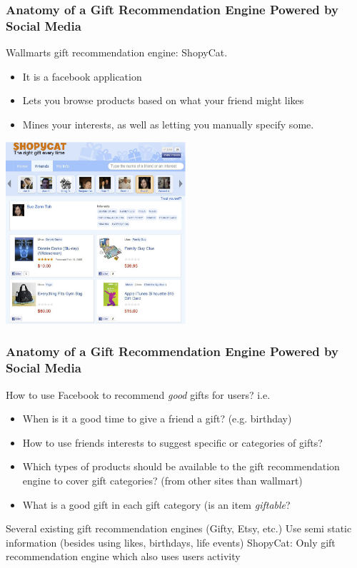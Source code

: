 \begin{frame}[plain] %
\frametitle{Anatomy of a Gift Recommendation Engine Powered by Social Media}

Wallmarts gift recommendation engine: ShopyCat.

\begin{itemize}
\item It is a facebook application
\item Lets you browse products based on what your friend might likes
\item Mines your interests, as well as letting you manually specify some.
\end{itemize}

    \includegraphics[width=0.5\textwidth]{images/SMC-5-1.png} 
\end{frame}

\begin{frame}[plain]
\frametitle{Anatomy of a Gift Recommendation Engine Powered by Social Media}

How to use Facebook to recommend \textit{good} gifts for users? i.e.
\begin{itemize}
\item When is it a good time to give a friend a gift? (e.g. birthday)
\item How to use friends interests to suggest specific or categories of gifts?
\item Which types of products should be available to the gift recommendation engine to cover gift categories? (from other sites than wallmart) 
\item What is a good gift in each gift category (is an item \textit{giftable}?
\end{itemize}

\vspace{0.5em}
\begin{itemize}
\ritem Several existing gift recommendation engines (Gifty, Etsy, etc.) Use semi static information (besides using likes, birthdays, life events)
\ritem ShopyCat: Only gift recommendation engine which also uses users activity 
\end{itemize}

\end{frame}


